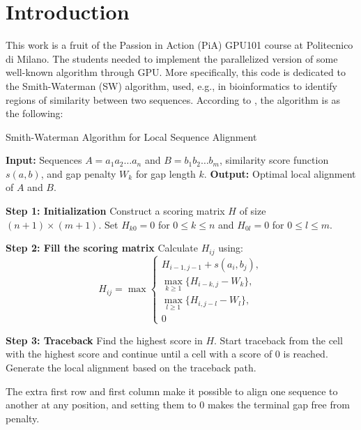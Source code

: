 \documentclass[conference]{IEEEtran}
\begin{document}
	\section{Introduction}
	This work is a fruit of the Passion in Action (PiA) GPU101 course at Politecnico di Milano. The students needed to implement the parallelized version of some well-known algorithm through GPU. More specifically, this code is dedicated to the Smith-Waterman (SW) algorithm, used, e.g., in bioinformatics to identify regions of similarity between two sequences. According to \cite{smith_waterman_algorithm}, the algorithm is as the following:
	\begin{algorithm}[H]
		\caption{Smith-Waterman Algorithm for Local Sequence Alignment}
		\begin{algorithmic}[1]
			\STATE \textbf{Input:} Sequences $A = a_1 a_2 \dots a_n$ and $B = b_1 b_2 \dots b_m$, similarity score function $s(a, b)$, and gap penalty $W_k$ for gap length $k$.
			\STATE \textbf{Output:} Optimal local alignment of $A$ and $B$.
			
			\STATE \textbf{Step 1: Initialization}
			\STATE Construct a scoring matrix $H$ of size $(n+1) \times (m+1)$.
			\STATE Set $H_{k0} = 0$ for $0 \leq k \leq n$ and $H_{0l} = 0$ for $0 \leq l \leq m$.
			
			\STATE \textbf{Step 2: Fill the scoring matrix}
			\STATE Calculate $H_{ij}$ using:\label{al}
			\[
			H_{ij} = \max\begin{cases} 
				H_{i-1, j-1} + s(a_i, b_j), \\
				\max_{k \geq 1} \{ H_{i-k, j} - W_k \}, \\
				\max_{l \geq 1} \{ H_{i, j-l} - W_l \}, \\
				0
			\end{cases}
			\]
			\ENDFOR
			\ENDFOR
			
			\STATE \textbf{Step 3: Traceback}
			\STATE Find the highest score in $H$.
			\STATE Start traceback from the cell with the highest score and continue until a cell with a score of $0$ is reached.
			\STATE Generate the local alignment based on the traceback path.
		\end{algorithmic}
	\end{algorithm}
	The extra first row and first column make it possible to align one sequence to another at any position, and setting them to 0 makes the terminal gap free from penalty.
\end{document}
